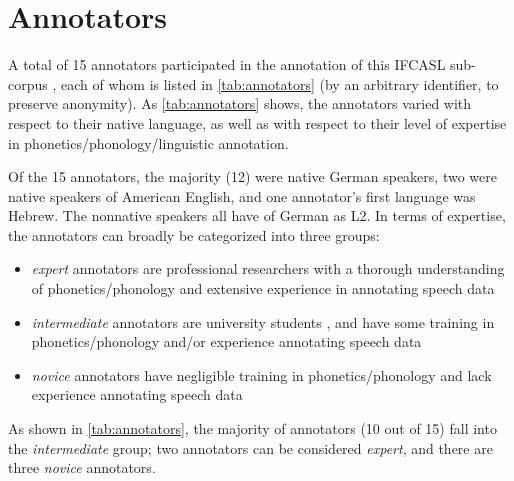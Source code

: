 	\section{Annotators}
	\label{sec:lexstress:annotators}
	
	A total of 15 annotators participated in the annotation of this IFCASL sub-corpus , each of whom is listed in \cref{tab:annotators} (by an arbitrary identifier, to preserve anonymity).
	As \cref{tab:annotators} shows, the annotators varied with respect to their native language, as well as with respect to their level of expertise in phonetics/phonology/linguistic annotation. 
	 
	Of the 15 annotators, the majority (12) were native German speakers, two were native speakers of American English, and one annotator's first language was Hebrew. The nonnative speakers all have   of German as L2.
	In terms of expertise, the annotators can broadly be categorized into three groups: 
	\begin{itemize}
	\item{\textit{expert} annotators are professional researchers with a thorough understanding of phonetics/phonology and extensive experience in annotating speech data}
	\item{\textit{intermediate} annotators are university students , and have some training in phonetics/phonology and/or experience annotating speech data}
	\item{\textit{novice} annotators have negligible training in phonetics/phonology and lack experience annotating speech data}
	\end{itemize}
	As shown in \cref{tab:annotators}, the majority of annotators (10 out of 15) fall into the \textit{intermediate} group; two annotators can be considered \textit{expert}, and there are three \textit{novice} annotators.
	
